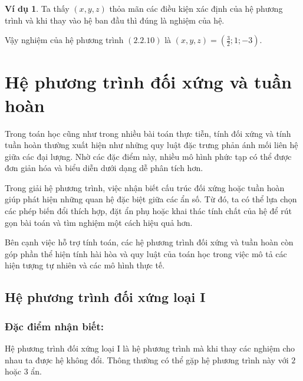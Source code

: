 \documentclass[12pt,a4paper,oneside]{book}
\theoremstyle{theorem}
\theoremstyle{definition}
\newtheorem{vd}[theorem2]{Ví dụ}
\begin{document}
\begin{vd}
Ta thấy $(x,y,z)$ thỏa mãn các điều kiện xác định của hệ phương trình và khi thay vào hệ ban đầu thì đúng là nghiệm của hệ.

Vậy nghiệm của hệ phương trình $(2.2.10)$ là $(x,y,z)=\displaystyle
\left(\frac{3}2;1;-3\right)$.
\end{vd}

 \section{Hệ phương trình đối xứng và tuần hoàn}
Trong toán học cũng như trong nhiều bài toán thực tiễn, tính đối xứng và tính
tuần hoàn thường xuất hiện như những quy luật đặc trưng phản ánh mối liên hệ
giữa các đại lượng. Nhờ các đặc điểm này, nhiều mô hình phức tạp có thể được
đơn giản hóa và biểu diễn dưới dạng dễ phân tích hơn.

Trong giải hệ phương trình, việc nhận biết cấu trúc đối xứng hoặc tuần hoàn
giúp phát hiện những quan hệ đặc biệt giữa các ẩn số. Từ đó, ta có thể lựa chọn
các phép biến đổi thích hợp, đặt ẩn phụ hoặc khai thác tính chất của hệ để rút
gọn bài toán và tìm nghiệm một cách hiệu quả hơn.

Bên cạnh việc hỗ trợ tính toán, các hệ phương trình đối xứng và tuần hoàn
còn góp phần thể hiện tính hài hòa và quy luật của toán học trong việc mô tả
các hiện tượng tự nhiên và các mô hình thực tế.

\subsection{Hệ phương trình đối xứng loại I}
\subsubsection{Đặc điểm nhận biết:} Hệ phương trình đối xứng loại I là hệ phương trình mà khi thay các nghiệm cho nhau ta được hệ không đổi. Thông thường có thể gặp hệ phương trình này với $2$ hoặc $3$ ẩn.
\end{document}
